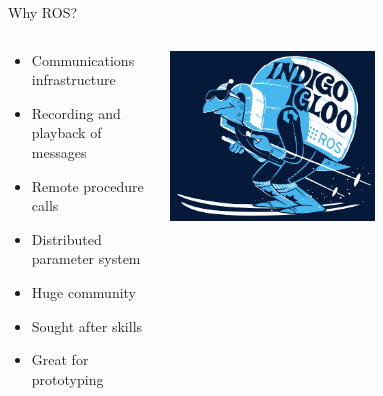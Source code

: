 \documentclass[aspectratio=43]{beamer}
\begin{document}

\begin{frame}{Why ROS?}
\begin{columns}
	\begin{column}{0.55\textwidth}
		\begin{itemize}
			\item Communications infrastructure
                          \item Recording and playback of messages
                          \item Remote procedure calls
                          \item Distributed parameter system
                          \item Huge community
                          \item Sought after skills
                          \item Great for prototyping
		\end{itemize} 
        \end{column} 
        \begin{column}{0.45\textwidth} 
          \centering 
          \includegraphics[width=0.6\textwidth]{fig/indigoigloo_600.png} 
        \end{column}
\end{columns}

\end{frame}
\end{document}
